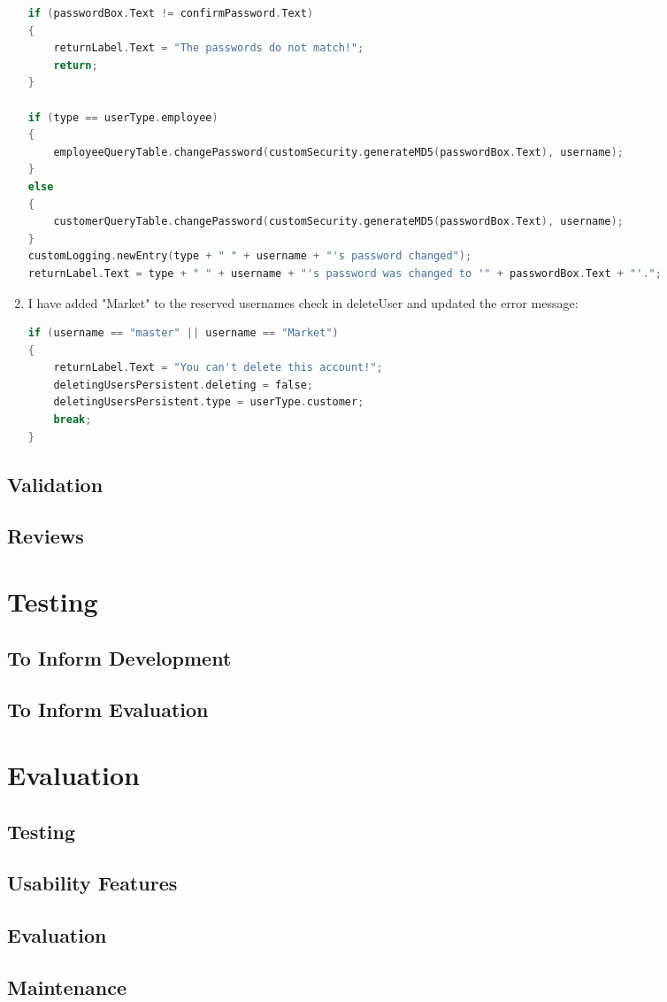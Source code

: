 ﻿\documentclass{article}
\begin{document}
\begin{enumerate}
\begin{lstlisting}[language=C]
if (passwordBox.Text != confirmPassword.Text)
{
    returnLabel.Text = "The passwords do not match!";
    return;
}

if (type == userType.employee)
{
    employeeQueryTable.changePassword(customSecurity.generateMD5(passwordBox.Text), username);
}
else
{
    customerQueryTable.changePassword(customSecurity.generateMD5(passwordBox.Text), username);
}
customLogging.newEntry(type + " " + username + "'s password changed");
returnLabel.Text = type + " " + username + "'s password was changed to '" + passwordBox.Text + "'.";
        \end{lstlisting}
        \item I have added "Market" to the reserved usernames check in deleteUser and updated the error message:
        \begin{lstlisting}[language=C]
if (username == "master" || username == "Market")
{
    returnLabel.Text = "You can't delete this account!";
    deletingUsersPersistent.deleting = false;
    deletingUsersPersistent.type = userType.customer;
    break;
}
        \end{lstlisting}
    \end{enumerate}
    \subsection{Validation}
    \subsection{Reviews}
    
    
    \section{Testing}
    \subsection{To Inform Development}
    \subsection{To Inform Evaluation}
    
    
    \section{Evaluation}
    \subsection{Testing}
    \subsection{Usability Features}
    \subsection{Evaluation}
    \subsection{Maintenance}
\end{document}
